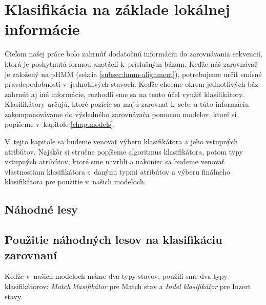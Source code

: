 \chapter[Klasifikácia]{Klasifikácia na základe lokálnej informácie}
\label{chap:clf}

Cieľom našej práce bolo zahrnúť dodatočnú informáciu do zarovnávania sekvencií, ktorá je poskytnutá formou anotácií k~príslušným bázam. Keďže náš zarovnávač je založený na pHMM (sekcia \ref{subsec:hmm-alignment}), potrebujeme určiť emisné pravdepodobnosti v~jednotlivých stavoch. Keďže chceme okrem jednotlivých báz zahrnúť aj iné informácie, rozhodli sme sa na tento účel využiť klasifikátory. Klasifikátory určujú, ktoré pozície sa majú zarovnať k~sebe a túto informáciu zakomponovávame do výsledného zarovnávača pomocou modelov, ktoré si popíšeme v~kapitole \ref{chap:models}.

V~tejto kapitole sa budeme venovať výberu klasifikátora a jeho vstupných atribútov. Najskôr si stručne popíšeme algoritmus klasifikátora, potom typy vstupných atribútov, ktoré sme navrhli a nakoniec sa budeme venovať vlastnostiam klasifikátora s~danými typmi atribútov a výberu finálneho klasifikátora pre použitie v~našich modeloch.

\section{Náhodné lesy}


\section[Použitie náh. lesov v~zarovnaní]{Použitie náhodných lesov na klasifikáciu zarovnaní}
\label{sec:use-rf-alignment}

Keďže v~našich modeloch máme dva typy stavov, použili sme dva typy klasifikátorov: \textit{Match klasifikátor} pre Match stav a \textit{Indel klasifikátor} pre Inzert stavy.

